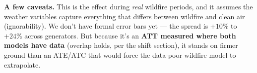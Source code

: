 \documentclass[11pt]{article}
\begin{document}
\textbf{A few caveats.} This is the effect during \emph{real} wildfire periods, and it
assumes the weather variables capture everything that differs between wildfire and clean
air (ignorability). We don't have formal error bars yet --- the spread is $+10\%$ to
$+24\%$ across generators. But because it's an \textbf{ATT measured where both models
have data} (overlap holds, per the shift section), it stands on firmer ground than an
ATE/ATC that would force the data-poor wildfire model to extrapolate.
\end{document}
